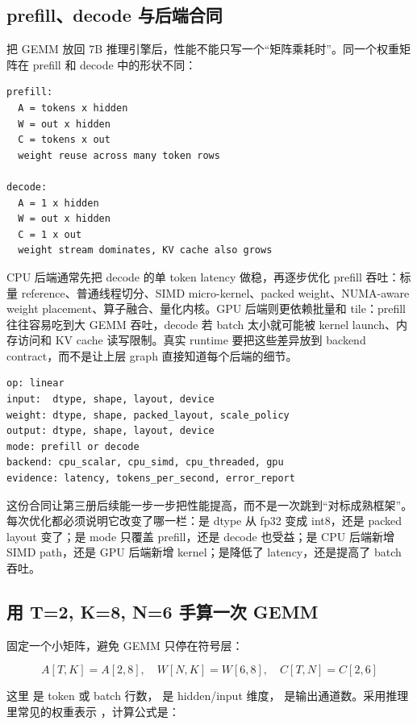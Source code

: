 \subsection{prefill、decode 与后端合同}

把 GEMM 放回 7B 推理引擎后，性能不能只写一个“矩阵乘耗时”。同一个权重矩阵在 prefill 和 decode 中的形状不同：

\begin{lstlisting}[numbers=none,caption={同一层在 prefill 和 decode 中的矩阵形态}]
prefill:
  A = tokens x hidden
  W = out x hidden
  C = tokens x out
  weight reuse across many token rows

decode:
  A = 1 x hidden
  W = out x hidden
  C = 1 x out
  weight stream dominates, KV cache also grows
\end{lstlisting}

CPU 后端通常先把 decode 的单 token latency 做稳，再逐步优化 prefill 吞吐：标量 reference、普通线程切分、SIMD micro-kernel、packed weight、NUMA-aware weight placement、算子融合、量化内核。GPU 后端则更依赖批量和 tile：prefill 往往容易吃到大 GEMM 吞吐，decode 若 batch 太小就可能被 kernel launch、内存访问和 KV cache 读写限制。真实 runtime 要把这些差异放到 backend contract，而不是让上层 graph 直接知道每个后端的细节。

\begin{lstlisting}[numbers=none,caption={GEMM 后端合同的最小字段}]
op: linear
input:  dtype, shape, layout, device
weight: dtype, shape, packed_layout, scale_policy
output: dtype, shape, layout, device
mode: prefill or decode
backend: cpu_scalar, cpu_simd, cpu_threaded, gpu
evidence: latency, tokens_per_second, error_report
\end{lstlisting}

这份合同让第三册后续能一步一步把性能提高，而不是一次跳到“对标成熟框架”。每次优化都必须说明它改变了哪一栏：是 dtype 从 fp32 变成 int8，还是 packed layout 变了；是 mode 只覆盖 prefill，还是 decode 也受益；是 CPU 后端新增 SIMD path，还是 GPU 后端新增 kernel；是降低了 latency，还是提高了 batch 吞吐。

\subsection{用 T=2, K=8, N=6 手算一次 GEMM}

固定一个小矩阵，避免 GEMM 只停在符号层：

\[
A[T,K] = A[2,8], \quad W[N,K] = W[6,8], \quad C[T,N] = C[2,6]
\]

这里  是 token 或 batch 行数， 是 hidden/input 维度， 是输出通道数。采用推理里常见的权重表示 ，计算公式是：

